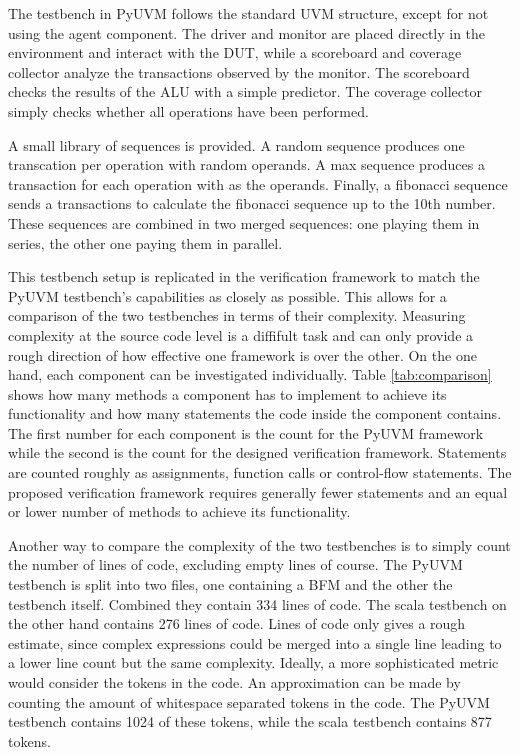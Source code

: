 The testbench in PyUVM follows the standard UVM structure, except for not using the agent component. The driver and monitor are placed directly in the environment and interact with the DUT, while a scoreboard and coverage collector analyze the transactions observed by the monitor. The scoreboard checks the results of the ALU with a simple predictor. The coverage collector simply checks whether all operations have been performed. 

A small library of sequences is provided. A random sequence produces one transcation per operation with random operands. A max sequence produces a transaction for each operation with  as the operands. Finally, a fibonacci sequence sends a transactions to calculate the fibonacci sequence up to the 10th number. These sequences are combined in two merged sequences: one playing them in series, the other one paying them in parallel. 

This testbench setup is replicated in the verification framework to match the PyUVM testbench's capabilities as closely as possible. This allows for a comparison of the two testbenches in terms of their complexity. Measuring complexity at the source code level is a diffifult task and can only provide a rough direction of how effective one framework is over the other. On the one hand, each component can be investigated individually. Table \ref{tab:comparison} shows how many methods a component has to implement to achieve its functionality and how many statements the code inside the component contains. The first number for each component is the count for the PyUVM framework while the second is the count for the designed verification framework. Statements are counted roughly as assignments, function calls or control-flow statements. The proposed verification framework requires generally fewer statements and an equal or lower number of methods to achieve its functionality. 

Another way to compare the complexity of the two testbenches is to simply count the number of lines of code, excluding empty lines of course. The PyUVM testbench is split into two files, one containing a BFM and the other the testbench itself. Combined they contain 334 lines of code. The scala testbench on the other hand contains 276 lines of code. Lines of code only gives a rough estimate, since complex expressions could be merged into a single line leading to a lower line count but the same complexity. Ideally, a more sophisticated metric would consider the tokens in the code. An approximation can be made by counting the amount of whitespace separated tokens in the code. The PyUVM testbench contains 1024 of these tokens, while the scala testbench contains 877 tokens. 

